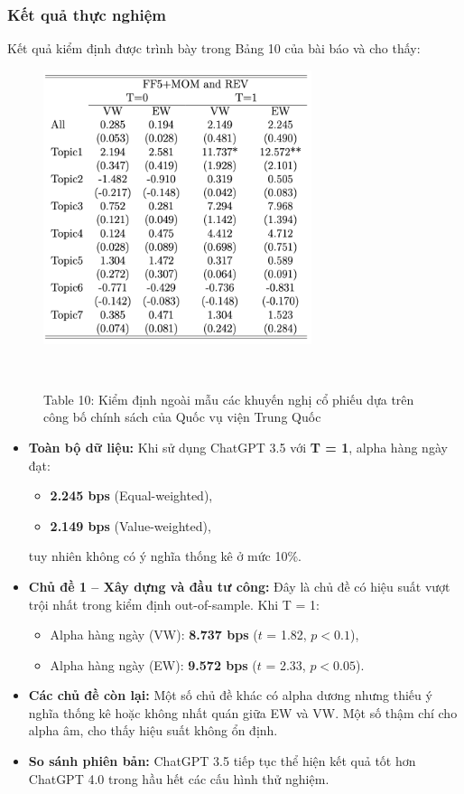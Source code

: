 \documentclass[a4paper,12pt]{article}
\begin{document}
\subsubsection{Kết quả thực nghiệm}

Kết quả kiểm định được trình bày trong Bảng 10 của bài báo và cho thấy:
\begin{figure}[H]
    \centering
    \includegraphics[width=0.7\textwidth]{table/tab10.png}
    \caption*{Table 10: Kiểm định ngoài mẫu các khuyến nghị cổ phiếu dựa trên công bố chính sách của Quốc vụ viện Trung Quốc}
    \
\end{figure}
\begin{itemize}
    \item \textbf{Toàn bộ dữ liệu:} Khi sử dụng ChatGPT 3.5 với \textbf{T = 1}, alpha hàng ngày đạt:
    \begin{itemize}
        \item \textbf{2.245 bps} (Equal-weighted), 
        \item \textbf{2.149 bps} (Value-weighted),
    \end{itemize}
    tuy nhiên không có ý nghĩa thống kê ở mức 10\%.

    \item \textbf{Chủ đề 1 – Xây dựng và đầu tư công:}  
    Đây là chủ đề có hiệu suất vượt trội nhất trong kiểm định out-of-sample. Khi T = 1:
    \begin{itemize}
        \item Alpha hàng ngày (VW): \textbf{8.737 bps} ($t$ = 1.82, $p < 0.1$),
        \item Alpha hàng ngày (EW): \textbf{9.572 bps} ($t$ = 2.33, $p < 0.05$).
    \end{itemize}
    
    \item \textbf{Các chủ đề còn lại:}  
    Một số chủ đề khác có alpha dương nhưng thiếu ý nghĩa thống kê hoặc không nhất quán giữa EW và VW. Một số thậm chí cho alpha âm, cho thấy hiệu suất không ổn định.

    \item \textbf{So sánh phiên bản:} ChatGPT 3.5 tiếp tục thể hiện kết quả tốt hơn ChatGPT 4.0 trong hầu hết các cấu hình thử nghiệm.
\end{itemize}
\end{document}
